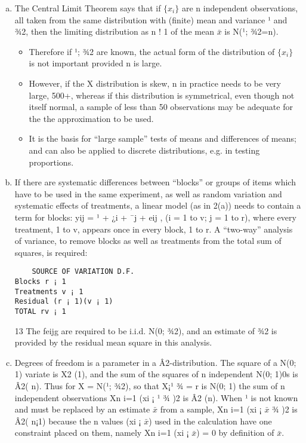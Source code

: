 \documentclass[a4paper,12pt]{article}
\begin{document}
\begin{enumerate}[(a)]
\item  The Central Limit Theorem says that if $\{x_i\}$ are n independent observations,
all taken from the same distribution with (finite) mean and variance ¹ and
¾2, then the limiting distribution as n ! 1 of the mean $\bar{x}$ is N(¹; ¾2=n).

\begin{itemize}
\item Therefore if ¹; ¾2 are known, the actual form of the distribution of $\{x_i\}$ is
not important provided n is large. 
\item However, if the X distribution is skew,
n in practice needs to be very large, 500+, whereas if this distribution is
symmetrical, even though not itself normal, a sample of less than 50 observations
may be adequate for the the approximation to be used.
\item It is the basis
for “large sample” tests of means and differences of means; and can also be
applied to discrete distributions, e.g. in testing proportions.
\end{itemize}

\item  If there are systematic differences between “blocks” or groups of items which
have to be used in the same experiment, as well as random variation and
systematic effects of treatments, a linear model (as in 2(a)) needs to contain
a term for blocks: yij = ¹ + ¿i + ¯j + eij , (i = 1 to v; j = 1 to r), where
every treatment, 1 to v, appears once in every block, 1 to r. A “two-way”
analysis of variance, to remove blocks as well as treatments from the total
sum of squares, is required:
\begin{verbatim}
    SOURCE OF VARIATION D.F.
Blocks r ¡ 1
Treatments v ¡ 1
Residual (r ¡ 1)(v ¡ 1)
TOTAL rv ¡ 1
\end{verbatim}

13
The feijg are required to be i.i.d. N(0; ¾2), and an estimate of ¾2 is provided
by the residual mean square in this analysis.
\item  Degrees of freedom is a parameter in a Â2-distribution. The square of a
N(0; 1) variate is X2
(1), and the sum of the squares of n independent N(0; 1)0s
is Â2(
n). Thus for X = N(¹; ¾2), so that X¡¹
¾ = r is N(0; 1) the sum of n
independent observations
Xn
i=1
(xi ¡ ¹
¾
)2 is Â2
(n). When ¹ is not known and
must be replaced by an estimate $\bar{x}$ from a sample,
Xn
i=1
(xi ¡ $\bar{x}$
¾
)2 is Â2(
n¡1)
because the n values (xi ¡ $\bar{x}$) used in the calculation have one constraint
placed on them, namely
Xn
i=1
(xi ¡ $\bar{x}$) = 0 by definition of $\bar{x}$. 


\end{enumerate}
\end{document}
